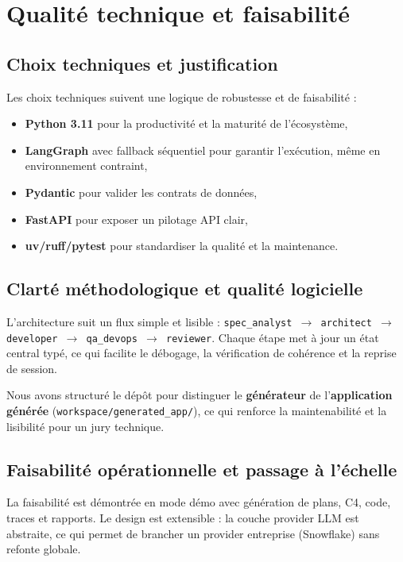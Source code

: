 \documentclass[11pt,a4paper]{article}
\begin{document}
\section{Qualité technique et faisabilité}
\subsection*{Choix techniques et justification}
Les choix techniques suivent une logique de robustesse et de faisabilité :
\begin{itemize}
  \item \textbf{Python 3.11} pour la productivité et la maturité de l'écosystème,
  \item \textbf{LangGraph} avec fallback séquentiel pour garantir l'exécution, même en environnement contraint,
  \item \textbf{Pydantic} pour valider les contrats de données,
  \item \textbf{FastAPI} pour exposer un pilotage API clair,
  \item \textbf{uv/ruff/pytest} pour standardiser la qualité et la maintenance.
\end{itemize}

\subsection*{Clarté méthodologique et qualité logicielle}
L'architecture suit un flux simple et lisible :
\texttt{spec\_analyst $\rightarrow$ architect $\rightarrow$ developer $\rightarrow$ qa\_devops $\rightarrow$ reviewer}.
Chaque étape met à jour un état central typé, ce qui facilite le débogage, la vérification de cohérence et la reprise de session.

Nous avons structuré le dépôt pour distinguer le \textbf{générateur} de l'\textbf{application générée} (\texttt{workspace/generated\_app/}), ce qui renforce la maintenabilité et la lisibilité pour un jury technique.

\subsection*{Faisabilité opérationnelle et passage à l'échelle}
La faisabilité est démontrée en mode démo avec génération de plans, C4, code, traces et rapports. Le design est extensible : la couche provider LLM est abstraite, ce qui permet de brancher un provider entreprise (Snowflake) sans refonte globale.
\end{document}
